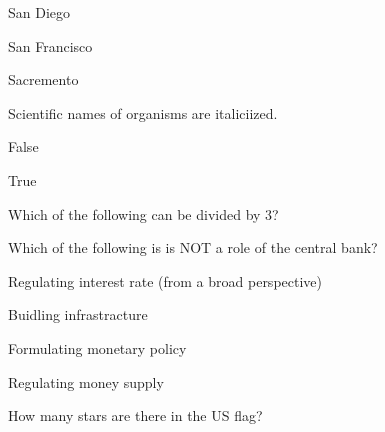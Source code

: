 \documentclass[12pt]{exam}
\begin{document}
\begin{questions}
\begin{oneparchoices}
            \choice San Diego
        
            \choice San Francisco
        
            \choice Sacremento
        
        \end{oneparchoices}

    \question Scientific names of organisms are italiciized.
    
        \begin{oneparchoices}
        
            \choice False
        
            \choice True
        
        \end{oneparchoices}

    \question Which of the following can be divided by 3?
    
        \begin{oneparchoices}
        
        
        
        
        
        \end{oneparchoices}

    \question Which of the following is is NOT a role of the central bank?
    
        \begin{oneparchoices}
        
            \choice Regulating interest rate (from a broad perspective)
        
            \choice Buidling infrastracture
        
            \choice Formulating monetary policy
        
            \choice Regulating money supply
        
        \end{oneparchoices}

    \question How many stars are there in the US flag?
    
        \begin{oneparchoices}
        
        
        
        
        
        \end{oneparchoices}

\end{questions}
\pagebreak
\end{document}
